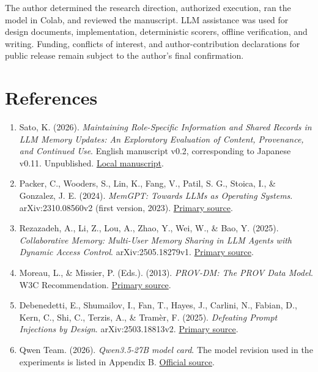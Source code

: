 \documentclass[10pt,a4paper]{article}
\newcommand{\tightlist}{\setlength{\itemsep}{1pt}\setlength{\parskip}{0pt}}
\begin{document}
The author determined the research direction, authorized execution, ran the model in Colab, and reviewed the manuscript. LLM assistance was used for design documents, implementation, deterministic scorers, offline verification, and writing. Funding, conflicts of interest, and author-contribution declarations for public release remain subject to the author's final confirmation.

\clearpage

\begingroup\raggedright

\section{References}\label{paper-02-references}

\begin{enumerate}
\def\labelenumi{\arabic{enumi}.}
\tightlist
\item
  Sato, K. (2026). \emph{Maintaining Role-Specific Information and Shared Records in LLM Memory Updates: An Exploratory Evaluation of Content, Provenance, and Continued Use}. English manuscript v0.2, corresponding to Japanese v0.11. Unpublished. \href{https://github.com/metaSATOKEN/MRSI/blob/9443de315d283874df0c27e0e99b8c04f400709d/papers/paper-01/MRSI_Paper1-en-v1.0.md}{Local manuscript}.
\item
  Packer, C., Wooders, S., Lin, K., Fang, V., Patil, S. G., Stoica, I., \& Gonzalez, J. E. (2024). \emph{MemGPT: Towards LLMs as Operating Systems}. arXiv:2310.08560v2 (first version, 2023). \href{https://arxiv.org/abs/2310.08560v2}{Primary source}.
\item
  Rezazadeh, A., Li, Z., Lou, A., Zhao, Y., Wei, W., \& Bao, Y. (2025). \emph{Collaborative Memory: Multi-User Memory Sharing in LLM Agents with Dynamic Access Control}. arXiv:2505.18279v1. \href{https://arxiv.org/abs/2505.18279v1}{Primary source}.
\item
  Moreau, L., \& Missier, P. (Eds.). (2013). \emph{PROV-DM: The PROV Data Model}. W3C Recommendation. \href{https://www.w3.org/TR/prov-dm/}{Primary source}.
\item
  Debenedetti, E., Shumailov, I., Fan, T., Hayes, J., Carlini, N., Fabian, D., Kern, C., Shi, C., Terzis, A., \& Tramèr, F. (2025). \emph{Defeating Prompt Injections by Design}. arXiv:2503.18813v2. \href{https://arxiv.org/abs/2503.18813v2}{Primary source}.
\item
  Qwen Team. (2026). \emph{Qwen3.5-27B model card}. The model revision used in the experiments is listed in Appendix B. \href{https://huggingface.co/Qwen/Qwen3.5-27B}{Official source}.

\end{enumerate}
\end{document}
